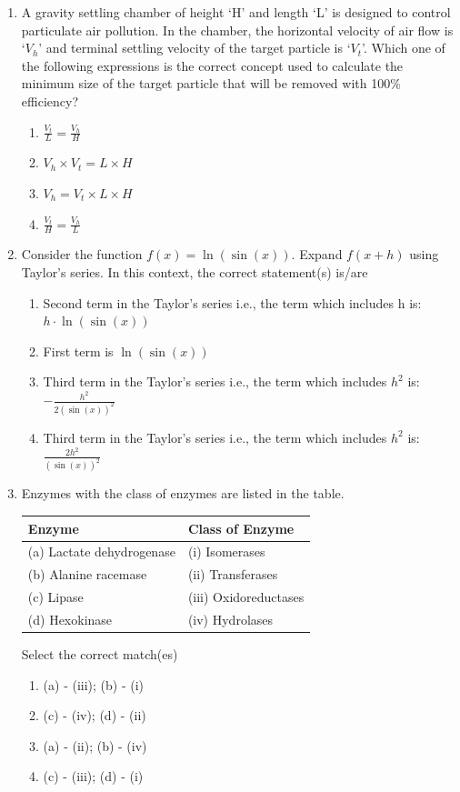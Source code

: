 \documentclass[journal]{IEEEtran}
\begin{document}
\begin{enumerate}
\item A gravity settling chamber of height `H' and length `L' is designed to control particulate air pollution. In the chamber, the horizontal velocity of air flow is `$V_{h}$' and terminal settling velocity of the target particle is `$V_{t}$'. Which one of the following expressions is the correct concept used to calculate the minimum size of the target particle that will be removed with 100\% efficiency?
\hfill{}
\begin{enumerate}
\item $\frac{V_{t}}{L} = \frac{V_{h}}{H}$
\item $V_{h} \times V_{t} = L \times H$
\item $V_{h} = V_{t} \times L \times H$
\item $\frac{V_{t}}{H} = \frac{V_{h}}{L}$
\end{enumerate}

\item Consider the function $f(x) = \ln(\sin(x))$. Expand $f(x+h)$ using Taylor's series. In this context, the correct statement(s) is/are
\hfill{}
\begin{enumerate}
\item Second term in the Taylor's series i.e., the term which includes h is: $h \cdot \ln(\sin(x))$
\item First term is $\ln(\sin(x))$
\item Third term in the Taylor's series i.e., the term which includes $h^2$ is: $-\frac{h^2}{2(\sin(x))^2}$
\item Third term in the Taylor's series i.e., the term which includes $h^2$ is: $\frac{2h^2}{(\sin(x))^2}$
\end{enumerate}

\item Enzymes with the class of enzymes are listed in the table.
\hfill{}
\begin{table}[H]
\centering
\begin{tabular}{|l|l|}
\hline
\textbf{Enzyme} & \textbf{Class of Enzyme} \\
\hline
(a) Lactate dehydrogenase & (i) Isomerases \\
\hline
(b) Alanine racemase & (ii) Transferases \\
\hline
(c) Lipase & (iii) Oxidoreductases \\
\hline
(d) Hexokinase & (iv) Hydrolases \\
\hline
\end{tabular}
\end{table}
Select the correct match(es)
\begin{enumerate}
\item (a) - (iii); (b) - (i)
\item (c) - (iv); (d) - (ii)
\item (a) - (ii); (b) - (iv)
\item (c) - (iii); (d) - (i)
\end{enumerate}


\end{enumerate}
\end{document}

